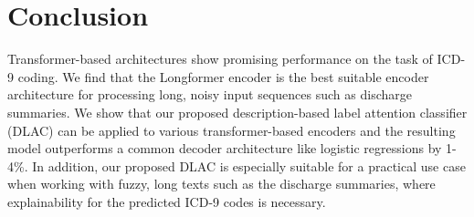 \documentclass[11pt]{article}
\begin{document}
\section{Conclusion}
Transformer-based architectures show promising performance on the task of ICD-9 coding. We find that the Longformer encoder is the best suitable encoder architecture for processing long, noisy input sequences such as discharge summaries. We show that our proposed description-based label attention classifier (DLAC) can be applied to various transformer-based encoders and the resulting model outperforms a common decoder architecture like logistic regressions by 1-4\%.
In addition, our proposed DLAC is especially suitable for a practical use case when working with fuzzy, long texts such as the discharge summaries, where explainability for the predicted ICD-9 codes is necessary.





\end{document}
